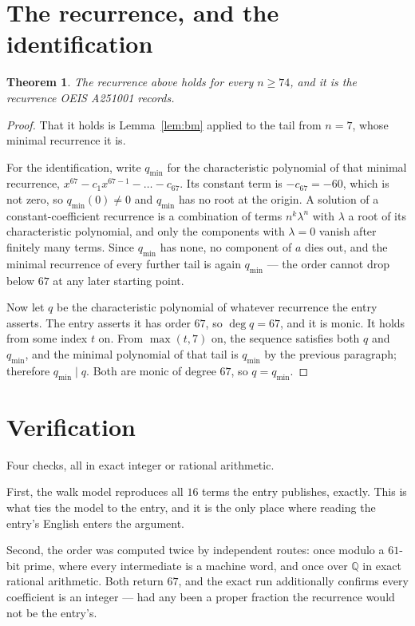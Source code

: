\documentclass[11pt,a4paper]{article}
\theoremstyle{plain}
\newtheorem{theorem}{Theorem}
\theoremstyle{definition}
\begin{document}
\section{The recurrence, and the identification}

\begin{theorem}
The recurrence above holds for every $n\ge74$, and it is the recurrence OEIS A251001 records.
\end{theorem}

\begin{proof}
That it holds is Lemma~\ref{lem:bm} applied to the tail from $n=7$, whose minimal
recurrence it is.

For the identification, write $q_{\min}$ for the characteristic polynomial of that minimal
recurrence, $x^{67}-c_1x^{67-1}-\dots-c_{67}$. Its constant term is
$-c_{67}=-60$, which is not zero, so $q_{\min}(0)\neq0$ and $q_{\min}$ has no
root at the origin. A solution of a constant-coefficient recurrence is a combination of terms
$n^{k}\lambda^{n}$ with $\lambda$ a root of its characteristic polynomial, and only the
components with $\lambda=0$ vanish after finitely many terms. Since $q_{\min}$ has none, no
component of $a$ dies out, and the minimal recurrence of every further tail is again
$q_{\min}$ --- the order cannot drop below $67$ at any later starting point.

Now let $q$ be the characteristic polynomial of whatever recurrence the entry asserts. The
entry asserts it has order $67$, so $\deg q=67$, and it is monic. It holds from some
index $t$ on. From $\max(t,7)$ on, the sequence satisfies both $q$ and $q_{\min}$, and
the minimal polynomial of that tail is $q_{\min}$ by the previous paragraph; therefore
$q_{\min}\mid q$. Both are monic of degree $67$, so $q=q_{\min}$.
\end{proof}

\section{Verification}

Four checks, all in exact integer or rational arithmetic.

First, the walk model reproduces all $16$ terms the entry publishes, exactly. This is
what ties the model to the entry, and it is the only place where reading the entry's English
enters the argument.

Second, the order was computed twice by independent routes: once modulo a $61$-bit prime, where
every intermediate is a machine word, and once over $\mathbb{Q}$ in exact rational arithmetic.
Both return $67$, and the exact run additionally confirms every coefficient is an integer
--- had any been a proper fraction the recurrence would not be the entry's.
\end{document}
